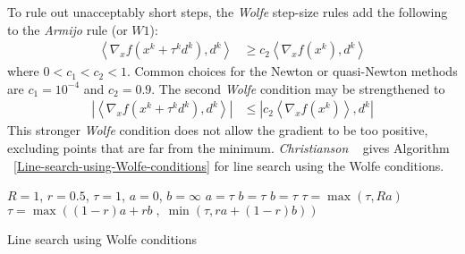 \documentclass[a4paper,twoside,10pt,english]{report}
\begin{document}
To rule out unacceptably short steps, the \emph{Wolfe} step-size rules add 
the following to the \emph{Armijo} rule (or $W1$):
\begin{align}
\left\langle \nabla_{x}f\left(x^{k}+\tau^{k}d^{k}\right),d^{k}\right\rangle &\ge
c_{2}\left\langle \nabla_{x}f\left(x^{k}\right),d^{k}\right\rangle
\tag{W2}
\end{align}
where $0<c_{1}<c_{2}<1$. Common choices for the Newton or quasi-Newton
methods are $c_{1}=10^{-4}$ and $c_{2}=0.9$. The second \emph{Wolfe} condition
may be strengthened to
\begin{align}
\left|\left\langle \nabla_{x}f\left(x^{k}+\tau^{k}d^{k}\right),d^{k}\right\rangle
\right| & \le \left|c_{2}\left\langle \nabla_{x}f\left(x^{k}\right)\right\rangle
,d^{k} \right|
\end{align}
This stronger \emph{Wolfe} condition does not allow the gradient to be too 
positive, excluding points that are far from the minimum. \emph{Christianson}
~\cite{Christianson_DeLinkedGoldsteinOrWolf} gives Algorithm 
~\ref{Line-search-using-Wolfe-conditions} for line search using the Wolfe 
conditions.
\begin{algorithm}[!htb]
\begin{algorithmic}
\State $R=1$, $r=0.5$, $\tau=1$, $a=0$, $b=\infty$
    \State $a=\tau$
  \Else
    \State $b=\tau$
  \EndIf
    \State $b=\tau$
  \Else
      \State $\tau=\max\left(\tau,Ra\right)$
    \Else
      \State $\tau=\max\left(\left(1-r\right)a+rb\;,\;
                   \min\left(\tau,ra+\left(1-r\right)b\right)\right)$
    \EndIf
  \EndIf
\EndWhile
\end{algorithmic}
\caption{Line search using Wolfe conditions}
\label{Line-search-using-Wolfe-conditions}
\end{algorithm}
\end{document}
